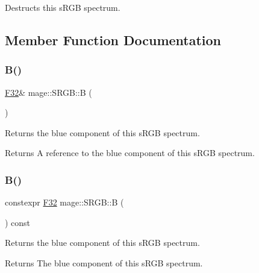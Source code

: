 Destructs this s\+R\+GB spectrum. 

\subsection{Member Function Documentation}
\mbox{\label{structmage_1_1_s_r_g_b_ab6b1ec933517eb2b9fe2e5fb488d8ab8}} 
\subsubsection{\texorpdfstring{B()}{B()}\hspace{0.1cm}{\footnotesize\ttfamily [1/2]}}
{\footnotesize\ttfamily \mbox{\hyperlink{namespacemage_aa97e833b45f06d60a0a9c4fc22ae02c0}{F32}}\& mage\+::\+S\+R\+G\+B\+::B (\begin{DoxyParamCaption}{ }\end{DoxyParamCaption})\hspace{0.3cm}{\ttfamily [noexcept]}}

Returns the blue component of this s\+R\+GB spectrum.

\begin{DoxyReturn}{Returns}
A reference to the blue component of this s\+R\+GB spectrum. 
\end{DoxyReturn}
\mbox{\label{structmage_1_1_s_r_g_b_adaeb952d093a477e435da495779c4e61}} 
\subsubsection{\texorpdfstring{B()}{B()}\hspace{0.1cm}{\footnotesize\ttfamily [2/2]}}
{\footnotesize\ttfamily constexpr \mbox{\hyperlink{namespacemage_aa97e833b45f06d60a0a9c4fc22ae02c0}{F32}} mage\+::\+S\+R\+G\+B\+::B (\begin{DoxyParamCaption}{ }\end{DoxyParamCaption}) const\hspace{0.3cm}{\ttfamily [noexcept]}}

Returns the blue component of this s\+R\+GB spectrum.

\begin{DoxyReturn}{Returns}
The blue component of this s\+R\+GB spectrum. 
\end{DoxyReturn}
\mbox{\label{structmage_1_1_s_r_g_b_a88494ac4bba90f80a5ec62690292f005}} 
